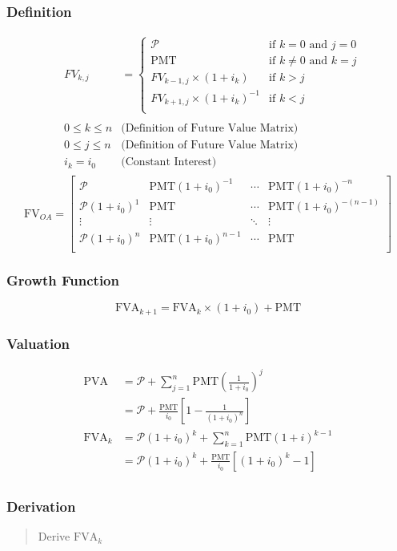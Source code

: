 \documentclass{article} %
\newcommand{\FVA}{\mathrm{FVA}} %
\newcommand{\PVA}{\mathrm{PVA}} %
\newcommand{\pmt}{\text{PMT}} %
\newcommand{\FV}{\mathrm{FV}} %
\newcommand{\p}{\mathcal{P}} %
\newcommand{\FVOA}{\FV_{O\!A}} %
\begin{document}
\subsubsection{Definition}
\begin{align*}
     & FV_{k,j}        & =
    \begin{cases}
        \p                               & \text{if } k = 0 \text{ and } j = 0    \\
        \pmt                             & \text{if } k \neq 0 \text{ and } k = j \\
        FV_{k-1,j} \times (1 + i_k)      & \text{if } k > j                       \\
        FV_{k+1,j} \times (1 + i_k)^{-1} & \text{if } k < j                       \\
    \end{cases} \\\\
     & 0 \leq k \leq n & \text{(Definition of Future Value Matrix)}           \\
     & 0 \leq j \leq n & \text{(Definition of Future Value Matrix)}           \\
     & i_k = i_0       & \text{(Constant Interest)}                           \\
\end{align*}
\[
    \FVOA =
    \begin{bmatrix}
        \p            & \pmt (1 + i_0)^{-1}  & \cdots & \pmt (1 + i_0)^{-n}       \\
        \p(1 + i_0)^1 & \pmt                 & \cdots & \pmt (1 + i_0)^{-(n - 1)} \\
        \vdots        & \vdots               & \ddots & \vdots                    \\
        \p(1 + i_0)^n & \pmt (1 + i_0)^{n-1} & \cdots & \pmt                      \\
    \end{bmatrix}
\]
\subsubsection{Growth Function}
\[\FVA_{k+1} = \FVA_{k} \times (1 + i_0) + \pmt\]

\subsubsection{Valuation}
\begin{align*}
    \PVA   & = \p + \sum_{j = 1}^{n} \pmt \left( \frac{1}{1+i_0} \right)^j            \\
           & = \p + \frac{\pmt}{i_0}\left[1 - \frac{1}{(1 + i_0)^n}\right]            \\
    \FVA_k & = \p(1+i_0)^k + \sum_{k = 1}^{n} \pmt (1 + i)^{k - 1}                    \\
           & =\p(1+i_0)^k + \displaystyle\frac{\pmt}{i_0}\left[(1 + i_0)^k - 1\right] \\
\end{align*}
\subsubsection{Derivation}
\begin{quote}
    Derive $\FVA_{k}$
\end{quote}
\end{document}
